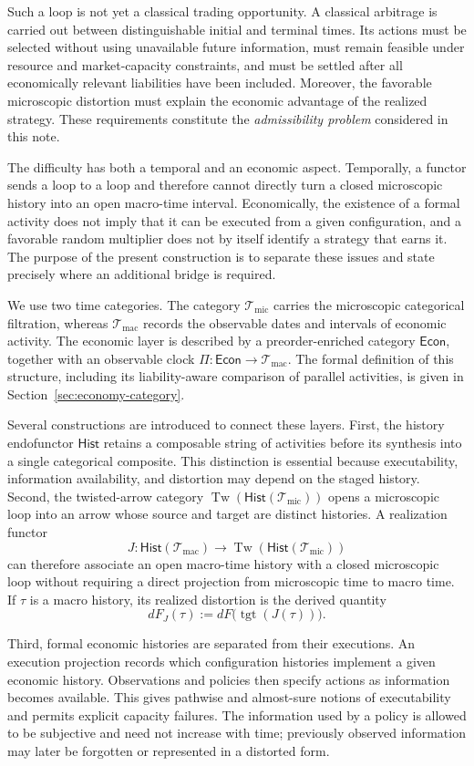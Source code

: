 \documentclass[11pt,a4paper]{article}
\newcommand{\Econ}{\mathsf{Econ}}
\newcommand{\Hist}{\mathsf{Hist}}
\newcommand{\Tw}{\operatorname{Tw}}
\newcommand{\Tmic}{\mathcal T_{\mathrm{mic}}}
\newcommand{\Tmac}{\mathcal T_{\mathrm{mac}}}
\DeclareMathOperator{\tgt}{tgt}
\begin{document}
Such a loop is not yet a classical trading opportunity.  A classical
arbitrage is carried out between distinguishable initial and terminal times.
Its actions must be selected without using unavailable future information,
must remain feasible under resource and market-capacity constraints, and
must be settled after all economically relevant liabilities have been
included.  Moreover, the favorable microscopic distortion must explain the
economic advantage of the realized strategy.  These requirements constitute
the \emph{admissibility problem} considered in this note.

The difficulty has both a temporal and an economic aspect.  Temporally, a
functor sends a loop to a loop and therefore cannot directly turn a closed
microscopic history into an open macro-time interval.  Economically, the
existence of a formal activity does not imply that it can be executed from a
given configuration, and a favorable random multiplier does not by itself
identify a strategy that earns it.  The purpose of the present construction
is to separate these issues and state precisely where an additional bridge
is required.

We use two time categories.  The category \(\Tmic\) carries the microscopic
categorical filtration, whereas \(\Tmac\) records the observable dates and
intervals of economic activity.  The economic layer is described by a
preorder-enriched category \(\Econ\), together with an observable clock
\(\Pi:\Econ\to\Tmac\).  The formal definition of this structure, including
its liability-aware comparison of parallel activities, is given in
Section~\ref{sec:economy-category}.

Several constructions are introduced to connect these layers.  First, the
history endofunctor \(\Hist\) retains a composable string of activities before
its synthesis into a single categorical composite.  This distinction is
essential because executability, information availability, and distortion
may depend on the staged history.  Second, the twisted-arrow category
\(\Tw(\Hist(\Tmic))\) opens a microscopic loop into an arrow whose source and
target are distinct histories.  A realization functor
\[
  J:\Hist(\Tmac)\longrightarrow\Tw(\Hist(\Tmic))
\]
can therefore associate an open macro-time history with a closed microscopic
loop without requiring a direct projection from microscopic time to macro
time.  If \(\tau\) is a macro history, its realized distortion is the derived
quantity
\[
  dF_J(\tau)
  :=dF\bigl(\tgt(J(\tau))\bigr).
\]

Third, formal economic histories are separated from their executions.  An
execution projection records which configuration histories implement a
given economic history.  Observations and policies then specify actions as
information becomes available.  This gives pathwise and almost-sure notions
of executability and permits explicit capacity failures.  The information
used by a policy is allowed to be subjective and need not increase with
time; previously observed information may later be forgotten or represented
in a distorted form.
\end{document}
